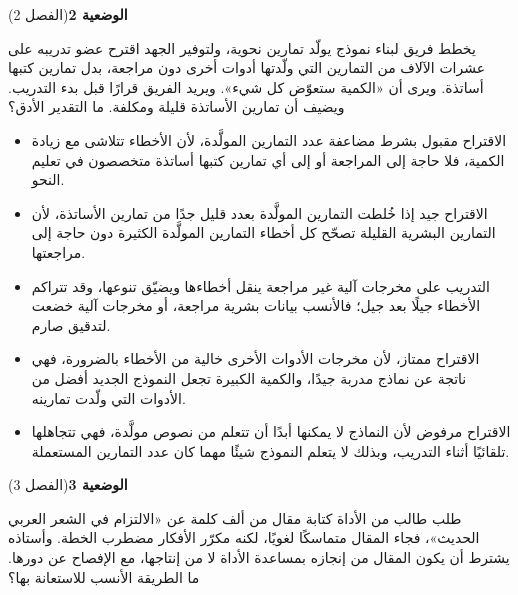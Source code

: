 \documentclass[11pt,a4paper]{article}
\begin{document}
\par\vspace{6pt}
\noindent
{\large\khatt\textbf{الوضعية 2}}\hfill{\small(الفصل 2)}\par\nopagebreak\vspace{3pt}
\setlength{\fboxsep}{7pt}\colorbox{gray!10}{\parbox{\dimexpr\linewidth-14pt}{يخطط فريق لبناء نموذج يولّد تمارين نحوية، ولتوفير الجهد اقترح عضو تدريبه على عشرات الآلاف من التمارين التي ولّدتها أدوات أخرى دون مراجعة، بدل تمارين كتبها أساتذة. ويرى أن «الكمية ستعوّض كل شيء». ويريد الفريق قرارًا قبل بدء التدريب. ويضيف أن تمارين الأساتذة قليلة ومكلفة. ما التقدير الأدق؟}}\par\nopagebreak
\begin{itemize}[leftmargin=1.0cm, labelsep=6pt, itemsep=3pt, topsep=4pt, parsep=0pt]
  \item[\textbf{أ)}] الاقتراح مقبول بشرط مضاعفة عدد التمارين المولَّدة، لأن الأخطاء تتلاشى مع زيادة الكمية، فلا حاجة إلى المراجعة أو إلى أي تمارين كتبها أساتذة متخصصون في تعليم النحو.
  \item[\textbf{ب)}] الاقتراح جيد إذا خُلطت التمارين المولَّدة بعدد قليل جدًا من تمارين الأساتذة، لأن التمارين البشرية القليلة تصحّح كل أخطاء التمارين المولَّدة الكثيرة دون حاجة إلى مراجعتها.
  \item[\textbf{ج)}] التدريب على مخرجات آلية غير مراجعة ينقل أخطاءها ويضيّق تنوعها، وقد تتراكم الأخطاء جيلًا بعد جيل؛ فالأنسب بيانات بشرية مراجعة، أو مخرجات آلية خضعت لتدقيق صارم.
  \item[\textbf{د)}] الاقتراح ممتاز، لأن مخرجات الأدوات الأخرى خالية من الأخطاء بالضرورة، فهي ناتجة عن نماذج مدربة جيدًا، والكمية الكبيرة تجعل النموذج الجديد أفضل من الأدوات التي ولّدت تمارينه.
  \item[\textbf{هـ)}] الاقتراح مرفوض لأن النماذج لا يمكنها أبدًا أن تتعلم من نصوص مولَّدة، فهي تتجاهلها تلقائيًا أثناء التدريب، وبذلك لا يتعلم النموذج شيئًا مهما كان عدد التمارين المستعملة.
\end{itemize}
\par\vspace{6pt}
\noindent
{\large\khatt\textbf{الوضعية 3}}\hfill{\small(الفصل 3)}\par\nopagebreak\vspace{3pt}
\setlength{\fboxsep}{7pt}\colorbox{gray!10}{\parbox{\dimexpr\linewidth-14pt}{طلب طالب من الأداة كتابة مقال من ألف كلمة عن «الالتزام في الشعر العربي الحديث»، فجاء المقال متماسكًا لغويًا، لكنه مكرّر الأفكار مضطرب الخطة. وأستاذه يشترط أن يكون المقال من إنجازه بمساعدة الأداة لا من إنتاجها، مع الإفصاح عن دورها. ما الطريقة الأنسب للاستعانة بها؟}}\par\nopagebreak
\end{document}
